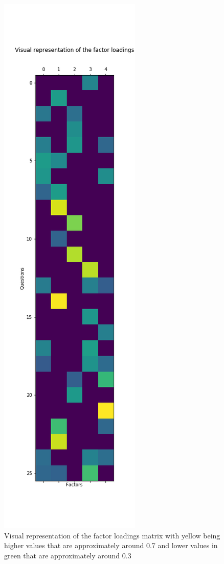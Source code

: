 \documentclass[twoside,twocolumn]{article}
\begin{document}
\begin{figure}
  \includegraphics[scale=0.45]{factor_loadings.png}
  \caption{Visual representation of the factor loadings matrix with yellow being higher values that are approximately around 0.7 and lower values in green that are approximately around 0.3}
\end{figure}
\end{document}
